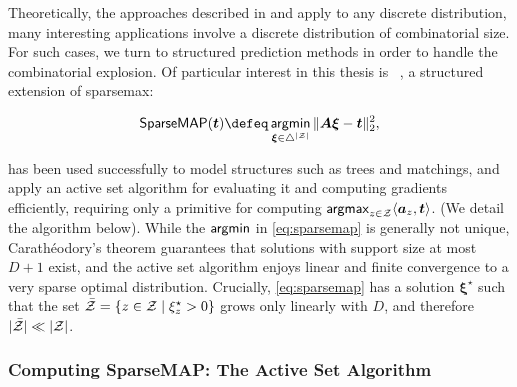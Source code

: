 Theoretically, the approaches described in 
and  apply to any discrete distribution, many
interesting applications involve a discrete distribution of
combinatorial size. For such cases, we turn to structured prediction
methods in order to handle the combinatorial explosion. Of particular
interest in this thesis is \smap~\citep{niculae2018sparsemap,
    sparsemapcg}, a structured extension of sparsemax:

\begin{equation}\label{eq:sparsemap}
    \smapop(\bm{t}) \defeq \argmin_{\pv \in \simplex^{|\ZZ|}}
    \|\bm{A}\pv - \bm{t}\|_2^2,
\end{equation}

\smap has been used successfully to model structures such as trees
and matchings, and \citet{niculae2018sparsemap} apply an active set
algorithm for evaluating it and computing gradients efficiently,
requiring only a primitive for computing $\operatorname*{\mathsf{argmax}}_{z \in \mathcal{Z}} \langle
    \bm{a}_z, \bm{t}\rangle$. (We detail the algorithm below). While the
$\operatorname*{\mathsf{argmin}}$ in \eqref{eq:sparsemap} is generally not unique,
Carath\'eodory's theorem guarantees that solutions with support size
at most $D+1$ exist, and the active set algorithm enjoys linear and
finite convergence to a very sparse optimal distribution. Crucially,
\eqref{eq:sparsemap} has a solution $\bm{\xi}^\star$ such that the
set $\bar{\mathcal{Z}} = \left\{z \in \mathcal{Z} \mid \xi^\star_z > 0\right\}$ grows
only linearly with $D$, and therefore $|\bar{\mathcal{Z}}| \ll |\mathcal{Z}|$.

\subsubsection{Computing SparseMAP: The Active Set Algorithm}\label{sec:smap_as_bg}

